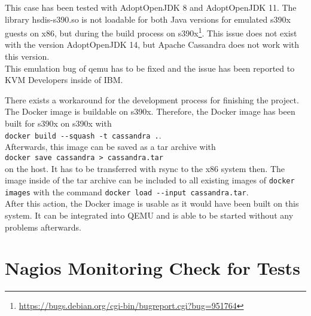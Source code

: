 This case has been tested with AdoptOpenJDK 8 and AdoptOpenJDK 11. The library hsdis-s390.so is not loadable for both Java versions for emulated s390x guests on x86, but during the build process on s390x\footnote{\url{https://bugs.debian.org/cgi-bin/bugreport.cgi?bug=951764}}. This issue does not exist with the version AdoptOpenJDK 14, but Apache Cassandra does not work with this version. \\
This emulation bug of qemu has to be fixed and the issue has been reported to \gls{KVM} Developers inside of IBM. 

There exists a workaround for the development process for finishing the project. The Docker image is buildable on s390x. Therefore, the Docker image has been built for s390x on s390x with \\  
\lstinline!docker build --squash -t cassandra .!. \\
Afterwards, this image can be saved as a tar archive with \\
\lstinline!docker save cassandra > cassandra.tar!\\ 
on the host. It has to be transferred with rsync to the x86 system then. The image inside of the tar archive can be included to all existing images of \lstinline!docker images! with the command 
\lstinline!docker load --input cassandra.tar!. \\
After this action, the Docker image is usable as it would have been built on this system. 
It can be integrated into \gls{QEMU} and is able to be started without any problems afterwards.

\section{Nagios Monitoring Check for Tests} \label{monitoring}

